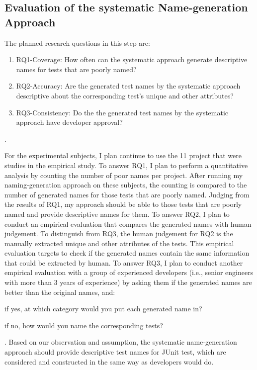 \subsection{Evaluation of the systematic Name-generation Approach}

The planned research questions in this step are:
%
\begin{enumerate}
    \item RQ1-Coverage: How often can the systematic approach generate descriptive names for tests that are poorly named?
    \item RQ2-Accuracy: Are the generated test names by the systematic approach descriptive about the corresponding test's unique and other attributes?
    \item RQ3-Consistency: Do the the generated test names by the systematic approach have developer approval?
\end{enumerate}.

For the experimental subjects, I plan continue to use the \num{11} project that were studies in the empirical study.
%
To answer RQ1, I plan to perform a quantitative analysis by counting the number of poor names per project.
%
After running my naming-generation approach on these subjects, the counting is compared to the number of generated names for those tests that are poorly named.
%
Judging from the results of RQ1, my approach should be able to those tests that are poorly named and provide descriptive names for them.
%
To answer RQ2, I plan to conduct an empirical evaluation that compares the generated names with human judgement.
%
To distinguish from RQ3, the human judgement for RQ2 is the manually extracted unique and other attributes of the tests.
%
This empirical evaluation targets to check if the generated names contain the same information that could be extracted by human.
%
To answer RQ3, I plan to conduct another empirical evaluation with a group of experienced developers (i.e., senior engineers with more than \num{3} years of experience) by asking them if the generated names are better than the original names, and:
\begin{enumerate*}
    \item if yes, at which category would you put each generated name in?
    \item if no, how would you name the corresponding tests?
\end{enumerate*}.
%
Based on our observation and assumption, the systematic name-generation approach should provide descriptive test names for JUnit test, which are considered and constructed in the same way as developers would do. 


